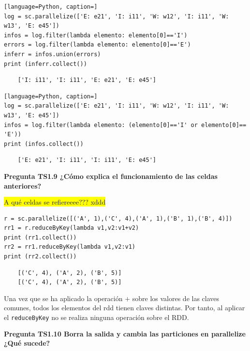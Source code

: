 \documentclass[10pt,swedish, openany]{book}
\begin{document}
\begin{lstlisting}[language=Python, caption=]
log = sc.parallelize(['E: e21', 'I: i11', 'W: w12', 'I: i11', 'W: w13', 'E: e45'])
infos = log.filter(lambda elemento: elemento[0]=='I')
errors = log.filter(lambda elemento: elemento[0]=='E')
inferr = infos.union(errors)
print (inferr.collect())
\end{lstlisting}
\begin{verbatim}
    ['I: i11', 'I: i11', 'E: e21', 'E: e45']
\end{verbatim}
\begin{lstlisting}[language=Python, caption=]
log = sc.parallelize(['E: e21', 'I: i11', 'W: w12', 'I: i11', 'W: w13', 'E: e45'])
infos = log.filter(lambda elemento: (elemento[0]=='I' or elemento[0]== 'E'))
print (infos.collect())
\end{lstlisting}
\begin{verbatim}
    ['E: e21', 'I: i11', 'I: i11', 'E: e45']
\end{verbatim}

\vspace{0.8em}

\textbf{Pregunta TS1.9 ¿Cómo explica el funcionamiento de las celdas anteriores?}

\colorbox{yellow}{A qué celdas se refiereeee??? xddd}

\begin{lstlisting}
r = sc.parallelize([('A', 1),('C', 4),('A', 1),('B', 1),('B', 4)])
rr1 = r.reduceByKey(lambda v1,v2:v1+v2)
print (rr1.collect())
rr2 = rr1.reduceByKey(lambda v1,v2:v1)
print (rr2.collect())
\end{lstlisting}
\begin{verbatim}
    [('C', 4), ('A', 2), ('B', 5)]
    [('C', 4), ('A', 2), ('B', 5)]
\end{verbatim}
Una vez que se ha aplicado la operación $+$ sobre los valores de las claves comunes, todos los elementos del rdd tienen claves distintas. Por tanto, al aplicar el \texttt{reduceByKey} no se realiza ninguna operación sobre el RDD.

\vspace{0.8em}

\textbf{Pregunta TS1.10 Borra la salida y cambia las particiones en parallelize ¿Qué sucede?}
\end{document}
